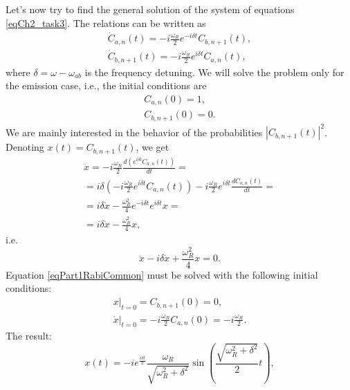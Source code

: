 Let's now try to find the general solution of the system of equations
\eqref{eqCh2_task3}. The relations can be written as
\begin{eqnarray}
  {\dot C}_{a,n}\left(t\right) = -i \frac{\omega_R}{2} e^{-i \delta t} 
C_{b, n + 1}\left(t\right),
\nonumber \\
{\dot C}_{b, n + 1}\left(t\right) = -i \frac{\omega_R}{2} e^{i \delta t} 
C_{a, n}\left(t\right),
  \nonumber
\end{eqnarray}
where $\delta = \omega - \omega_{ab}$ is the frequency detuning.
We will solve the problem only for the emission case, i.e., the initial
conditions are
\begin{eqnarray}
  C_{a,n}\left(0\right) = 1,
  \nonumber \\
  C_{b,n+1}\left(0\right) = 0.
  \nonumber
\end{eqnarray}
We are mainly interested in the behavior of the probabilities
$\left|C_{b, n + 1}\left(t\right)\right|^2$. Denoting $x\left(t\right) = C_{b,n+1}\left(t\right)$, we get
\begin{eqnarray}
  \ddot{x} =  -i \frac{\omega_R}{2} \frac{d \left(e^{i \delta t} 
    C_{a, n}\left(t\right)\right) }{d t} =
  \nonumber \\
  = i \delta \left(- i \frac{\omega_R}{2} e^{ i\delta t} 
  C_{a, n}\left(t\right) \right) -i \frac{\omega_R}{2} e^{i \delta t}
  \frac{d C_{a, n}\left(t\right)}{dt} =
  \nonumber \\
  = i \delta \dot{x} - \frac{\omega_R^2}{4} e^{-i \delta t} e^{i \delta t} x =
  \nonumber \\
  = i \delta \dot{x} - \frac{\omega_R^2}{4} x,
  \nonumber
\end{eqnarray}
i.e.
\begin{equation}
  \ddot{x} - i \delta \dot{x} + \frac{\omega_R^2}{4} x = 0.
  \label{eqPart1RabiCommon}
\end{equation}
Equation \eqref{eqPart1RabiCommon} must be solved with the following
initial conditions:
\begin{eqnarray}
  \left.x\right|_{t=0} = C_{b,n+1}\left(0\right) = 0,
  \nonumber \\
  \left.\dot{x}\right|_{t=0} = -i \frac{\omega_R}{2} C_{a,n}\left(0\right) =
  -i \frac{\omega_R}{2}.
  \nonumber
\end{eqnarray}
The result:
\begin{equation}
  x\left(t\right) = -  i e^{\frac{ i \delta t}{2}}
  \frac{\omega_R}{\sqrt{\omega_R^2 + \delta^2}}
  \sin{\left(\frac{\sqrt{\omega_R^2 + \delta^2}}{2}t\right)},
  \nonumber
\end{equation}
